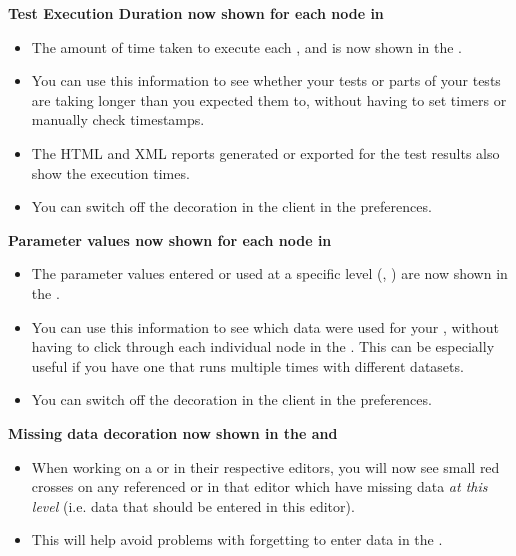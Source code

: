 \textbf{Test Execution Duration now shown for each node in \gdtestresultview{}}\\
\begin{itemize}
\item The amount of time taken to execute each \gdstep{}, \gdcase{} and \gdsuite{} is now shown in the \gdtestresultview{}.
\item You can use this information to see whether your tests or parts of your tests are taking longer than you expected them to, 
without having to set timers or manually check timestamps.
\item The HTML and XML reports generated or exported for the test results also show the execution times.
\item You can switch off the decoration in the \app{} client in the  preferences.
\end{itemize} 

\textbf{Parameter values now shown for each node in \gdtestresultview{}}\\
\begin{itemize}
\item The parameter values entered or used at a specific level (\gdcase{}, \gdstep{}) are now shown in the \gdtestresultview{}.
\item You can use this information to see which data were used for your \gdcases{}, without having to click through each individual node in the \gdtestresultview{}. This can be especially useful if you have one \gdcase{} that runs multiple times with different datasets.
\item You can switch off the decoration in the \app{} client in the  preferences.
\end{itemize} 

\textbf{Missing data decoration now shown in the \gdtestcaseeditor{} and \gdtestsuiteeditor{}}
\begin{itemize}
\item When working on a \gdcase{} or \gdsuite{} in their respective editors, you will now see small red crosses on any referenced \gdcases{} or \gdsteps{} in that editor which have missing data \textit{at this level} (i.e. data that should be entered in this editor). 
\item This will help avoid problems with forgetting to enter data in the \gdpropview{}. 

\end{itemize}

